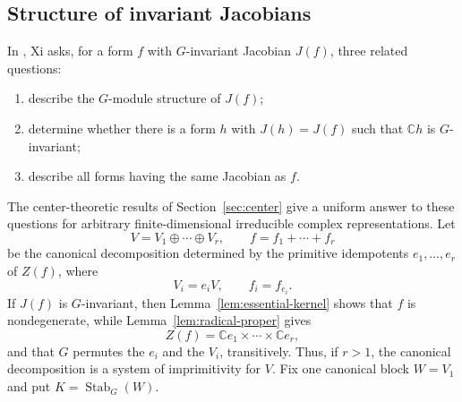 \documentclass[11pt,reqno]{amsart}
\numberwithin{equation}{section}
\theoremstyle{definition}
\theoremstyle{remark}
\newcommand{\C}{\mathbb C}
\newcommand{\Stab}{\operatorname{Stab}}
\begin{document}
\subsection{Structure of invariant Jacobians}
\label{subsec:jacobian-structure}
\label{subsec:finite-fibres}

In \cite[Section~3.5]{Xi}, Xi asks, for a form $f$ with
$G$-invariant Jacobian $J(f)$, three related questions:
\begin{enumerate}[label=\textup{(\roman*)},leftmargin=0.9cm]
\item describe the $G$-module structure of $J(f)$;
\item determine whether there is a form $h$ with $J(h)=J(f)$ such
      that $\C h$ is $G$-invariant;
\item describe all forms having the same Jacobian as $f$.
\end{enumerate}
The center-theoretic results of Section~\ref{sec:center} give a
uniform answer to these questions for arbitrary finite-dimensional
irreducible complex representations. Let
\[
  V=V_1\oplus\cdots\oplus V_r,
  \qquad
  f=f_1+\cdots+f_r
\]
be the canonical decomposition determined by the primitive
idempotents $e_1,\ldots,e_r$ of $Z(f)$, where
\[
  V_i=e_iV,
  \qquad
  f_i=f_{e_i}.
\]
If $J(f)$ is $G$-invariant, then Lemma~\ref{lem:essential-kernel}
shows that $f$ is nondegenerate, while
Lemma~\ref{lem:radical-proper} gives
\[
  Z(f)=\C e_1\times\cdots\times\C e_r,
\]
and that $G$ permutes the $e_i$ and the $V_i$,
transitively.  Thus, if $r>1$, the canonical decomposition is a
system of imprimitivity for $V$. Fix one canonical block $W=V_1$ and put $ K=\Stab_G(W)$.
\end{document}
